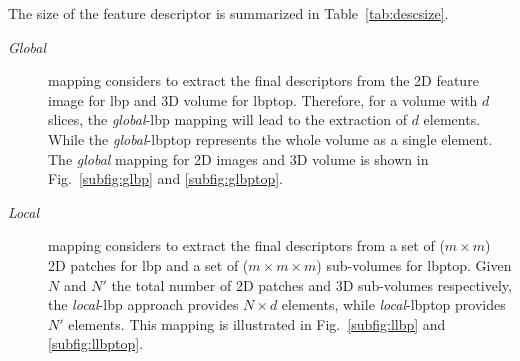 The size of the feature descriptor is summarized in Table~\ref{tab:descsize}.

\begin{description}
\item[\emph{Global}] mapping considers to extract the final descriptors from the 2D feature image for \ac{lbp} and 3D volume for \ac{lbptop}.
Therefore, for a volume with $d$ slices, the \emph{global}-\ac{lbp} mapping will lead to the extraction of $d$ elements.
While the \emph{global}-\ac{lbptop} represents the whole volume as a single element.
The \emph{global} mapping for 2D images and 3D volume is shown in Fig.~\ref{subfig:glbp} and \ref{subfig:glbptop}.

\item[\emph{Local}] mapping considers to extract the final descriptors from a set of ($m \times m$) 2D patches for \ac{lbp} and a set of ($ m \times m \times m$) sub-volumes for \ac{lbptop}.
Given $N$ and $N'$ the total number of 2D patches and 3D sub-volumes respectively, the \emph{local}-\ac{lbp} approach provides $N \times d$ elements, while \emph{local}-\ac{lbptop} provides $N'$ elements.
This mapping is illustrated in Fig.~\ref{subfig:llbp} and \ref{subfig:llbptop}.


\end{description}

%


